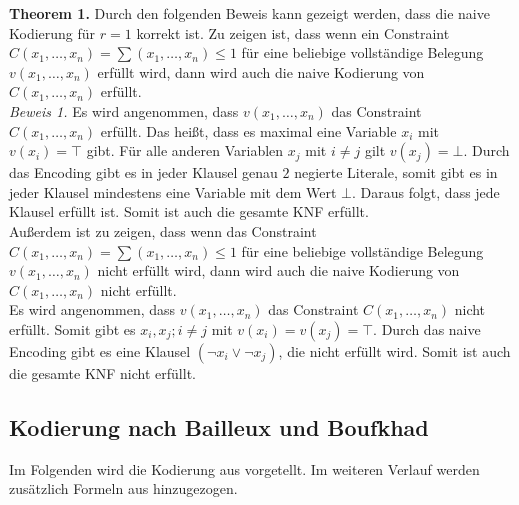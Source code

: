 \documentclass[a4,abstract=on]{scrartcl}
\begin{document}
\textbf{Theorem 1.} Durch den folgenden Beweis kann gezeigt werden, dass die naive Kodierung für $r=1$ korrekt ist. Zu zeigen ist, dass wenn ein Constraint $C(x_1, \dots, x_n) = \sum(x_1, \dots,x_n) \leq 1$ für eine beliebige vollständige Belegung $v(x_1, \dots ,x_n)$ erfüllt wird, dann wird auch die naive Kodierung von $C(x_1, \dots, x_n)$ erfüllt.\\
\newline
\textit{Beweis 1.} Es wird angenommen, dass $v(x_1, \dots ,x_n)$ das Constraint $C(x_1, \dots, x_n)$ erfüllt. Das heißt, dass es maximal eine Variable $x_i$ mit $v(x_i) = \top$ gibt. Für alle anderen Variablen $x_j$ mit $i \neq j$ gilt $v(x_j) = \bot$. Durch das Encoding gibt es in jeder Klausel genau $2$ negierte Literale, somit gibt es in jeder Klausel mindestens eine Variable mit dem Wert $\bot$. Daraus folgt, dass jede Klausel erfüllt ist. Somit ist auch die gesamte KNF erfüllt.\\
Außerdem ist zu zeigen, dass wenn das Constraint $C(x_1, \dots, x_n) = \sum(x_1, \dots,x_n) \leq 1$ für eine beliebige vollständige Belegung $v(x_1, \dots ,x_n)$ nicht erfüllt wird, dann wird auch die naive Kodierung von $C(x_1, \dots, x_n)$ nicht erfüllt.\\
Es wird angenommen, dass $v(x_1, \dots ,x_n)$ das Constraint $C(x_1, \dots, x_n)$ nicht erfüllt. Somit gibt es $x_i, x_j; i \neq j$ mit $v(x_i) = v(x_j) = \top$. Durch das naive Encoding gibt es eine Klausel $(\neg x_i \vee \neg x_j)$, die nicht erfüllt wird. Somit ist auch die gesamte KNF nicht erfüllt.


	\subsection{Kodierung nach Bailleux und Boufkhad}
Im Folgenden wird die Kodierung aus \cite[][]{bailleux} vorgetellt. Im weiteren Verlauf werden zusätzlich Formeln aus \cite[][]{knuth} hinzugezogen.
\end{document}
